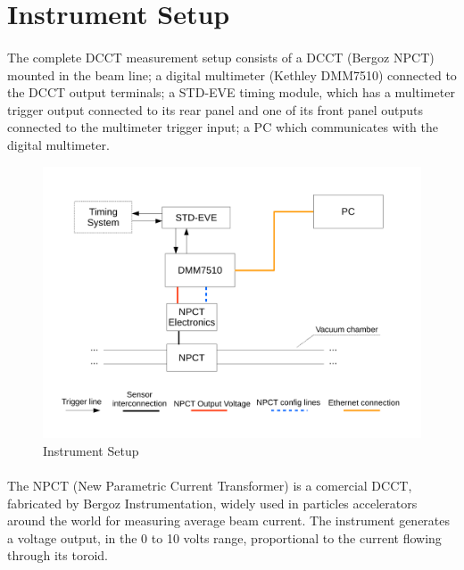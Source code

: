 \documentclass[openany]{article}
\begin{document}
\section{Instrument Setup}

	\paragraph{} The complete DCCT measurement setup consists of a DCCT (Bergoz NPCT) mounted in the beam line; a digital multimeter (Kethley DMM7510) connected to the DCCT output terminals; a STD-EVE timing module, which has a multimeter trigger output connected to its rear panel and one of its front panel outputs connected to the multimeter trigger input; a PC which communicates with the digital multimeter.

	\begin{figure}[!h]
		\caption{Instrument Setup}
		\label{fig:dcct-setup}
		\centering
		\includegraphics[width=1.0\textwidth]{dcct-setup-image}
	\end{figure}
\FloatBarrier

	\paragraph{} The NPCT (New Parametric Current Transformer) is a comercial DCCT, fabricated by Bergoz Instrumentation, widely used in particles accelerators around the world for measuring average beam current. The instrument generates a voltage output, in the 0 to 10 volts range, proportional to the current flowing through its toroid.
\end{document}
